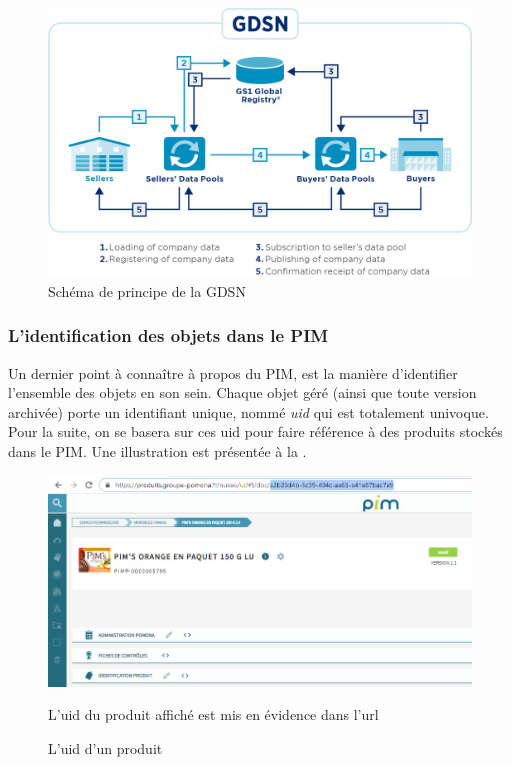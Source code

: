                 \begin{figure}[htpb]
                    \begin{center}
                    \includegraphics[width=\linewidth]{img/gdsn-schema.png}
                    \end{center}
                    \caption{Schéma de principe de la GDSN}
                    \label{fig:GDSN}
                \end{figure}                 
                
                \subsubsection{L'identification des objets dans le PIM}

                Un dernier point à connaître à propos du PIM, est la manière d'identifier l'ensemble des objets en son sein.
                Chaque objet géré (ainsi que toute version archivée) porte un identifiant unique, nommé \emph{uid} qui est totalement univoque.
                Pour la suite, on se basera sur ces uid pour faire référence à des produits stockés dans le PIM.
                Une illustration est présentée à la .

                \begin{figure}[htpb]
                    \begin{center}
                    \includegraphics[width=\linewidth]{img/uid.png}
                    \end{center}
                    L'uid du produit affiché est mis en évidence dans l'url
                    \caption{L'uid d'un produit}
                    \label{fig:uid}
                \end{figure}                 

